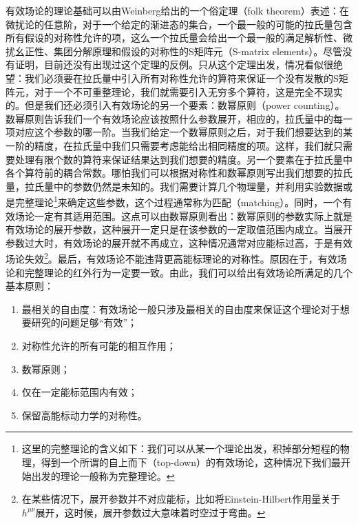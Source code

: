 有效场论的理论基础可以由Weinberg给出的一个俗定理（folk theorem）表述：在微扰论的任意阶，对于一个给定的渐进态的集合，一个最一般的可能的拉氏量包含所有假设的对称性允许的项，这么一个拉氏量会给出一个最一般的满足解析性、微扰幺正性、集团分解原理和假设的对称性的S矩阵元（S-matrix elements）。尽管没有证明，目前还没有出现过这个定理的反例。只从这个定理出发，情况看似很绝望：我们必须要在拉氏量中引入所有对称性允许的算符来保证一个没有发散的S矩阵元，对于一个不可重整理论，我们就需要引入无穷多个算符，这是完全不现实的。但是我们还必须引入有效场论的另一个要素：数幂原则（power counting）。数幂原则告诉我们一个有效场论应该按照什么参数展开，相应的，拉氏量中的每一项对应这个参数的哪一阶。当我们给定一个数幂原则之后，对于我们想要达到的某一阶的精度，在拉氏量中我们只需要考虑能给出相同精度的项。这样，我们就只需要处理有限个数的算符来保证结果达到我们想要的精度。另一个要素在于拉氏量中各个算符前的耦合常数。哪怕我们可以根据对称性和数幂原则写出我们想要的拉氏量，拉氏量中的参数仍然是未知的。我们需要计算几个物理量，并利用实验数据或是完整理论\footnote{这里的完整理论的含义如下：我们可以从某一个理论出发，积掉部分短程的物理，得到一个所谓的自上而下（top-down）的有效场论，这种情况下我们最开始出发的理论一般称为完整理论。}来确定这些参数，这个过程通常称为匹配（matching）。同时，一个有效场论一定有其适用范围。这点可以由数幂原则看出：数幂原则的参数实际上就是有效场论的展开参数，这种展开一定只是在该参数的一定取值范围内成立。当展开参数过大时，有效场论的展开就不再成立，这种情况通常对应能标过高，于是有效场论失效\footnote{在某些情况下，展开参数并不对应能标，比如将Einstein-Hilbert作用量关于$h^{\mu\nu}$展开，这时候，展开参数过大意味着时空过于弯曲。}。最后，有效场论不能违背更高能标理论的对称性。原因在于，有效场论和完整理论的红外行为一定要一致。由此，我们可以给出有效场论所满足的几个基本原则：
\begin{enumerate}
	\item 最相关的自由度：有效场论一般只涉及最相关的自由度来保证这个理论对于想要研究的问题足够“有效”；
	\item 对称性允许的所有可能的相互作用；
	\item 数幂原则；
	\item 仅在一定能标范围内有效；
	\item 保留高能标动力学的对称性。
\end{enumerate}

